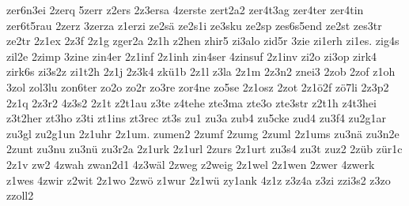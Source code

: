 {zer6n3ei
2zerq
5zerr
z2ers
2z3ersa
4zerste
zert2a2
zer4t3ag
zer4ter
zer4tin
zer6t5rau
2zerz
3zerza
z1erzi
ze2sä
ze2s1i
ze3sku
ze2sp
zes6s5end
ze2st
zes3tr
ze2tr
2z1ex
2z3f
2z1g
zger2a
2z1h
z2hen
zhir5
zi3alo
zid5r
3zie
zi1erh
zi1es.
zig4s
zil2e
2zimp
3zine
zin4er
2z1inf
2z1inh
zin4ser
4zinsuf
2z1inv
zi2o
zi3op
zirk4
zirk6s
zi3s2z
zi1t2h
2z1j
2z3k4
zkü1b
2z1l
z3la
2z1m
2z3n2
znei3
2zob
2zof
z1oh
3zol
zol3lu
zon6ter
zo2o
zo2r
zo3re
zor4ne
zo5se
2z1osz
2zot
2z1ö2f
zö7li
2z3p2
2z1q
2z3r2
4z3s2
2z1t
z2t1au
z3te
z4tehe
zte3ma
zte3o
zte3str
z2t1h
z4t3hei
z3t2her
zt3ho
z3ti
zt1ins
zt3rec
zt3s
zu1
zu3a
zub4
zu5cke
zud4
zu3f4
zu2g1ar
zu3gl
zu2g1un
2z1uhr
2z1um.
zumen2
2zumf
2zumg
2zuml
2z1ums
zu3nä
zu3n2e
2zunt
zu3nu
zu3nü
zu3r2a
2z1urk
2z1url
2zurs
2z1urt
zu3s4
zu3t
zuz2
2züb
zür1c
2z1v
zw2
4zwah
zwan2d1
4z3wäl
2zweg
z2weig
2z1wel
2z1wen
2zwer
4zwerk
z1wes
4zwir
z2wit
2z1wo
2zwö
z1wur
2z1wü
zy1ank
4z1z
z3z4a
z3zi
zzi3s2
z3zo
zzoll2
}

